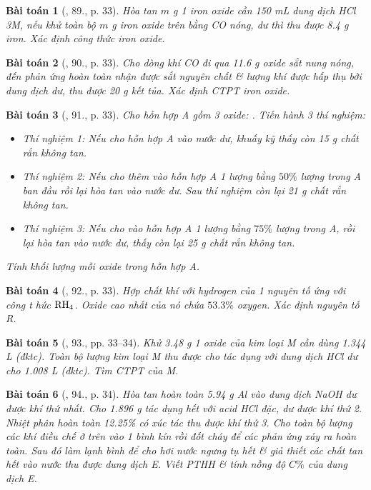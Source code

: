 \documentclass{article}
\newtheorem{baitoan}{Bài toán}
\begin{document}
\begin{baitoan}[\cite{An_400_BT_Hoa_Hoc_9}, 89., p. 33]
	Hòa tan $m$ {\rm g} 1 iron oxide cần {\rm150 mL} dung dịch {\rm HCl 3M}, nếu khử toàn bộ $m$ {\rm g} iron oxide trên bằng {\rm CO} nóng, dư thì thu được {\rm8.4 g} iron. Xác định công thức iron oxide.
\end{baitoan}

\begin{baitoan}[\cite{An_400_BT_Hoa_Hoc_9}, 90., p. 33]
	Cho dòng khí {\rm CO} đi qua {\rm11.6 g} oxide sắt nung nóng, đến phản ứng hoàn toàn nhận được sắt nguyên chất \& lượng khí được hấp thụ bởi dung dịch {\rm{}} dư, thu được {\rm20 g} kết tủa. Xác định {\rm CTPT} iron oxide.
\end{baitoan}

\begin{baitoan}[\cite{An_400_BT_Hoa_Hoc_9}, 91., p. 33]
	Cho hỗn hợp A gồm 3 oxide: {\rm{}}. Tiến hành 3 thí nghiệm:
	\begin{itemize}
		\item Thí nghiệm 1: Nếu cho hỗn hợp A vào nước dư, khuấy kỹ thấy còn {\rm15 g} chất rắn không tan.
		\item Thí nghiệm 2: Nếu cho thêm vào hỗn hợp A 1 lượng {\rm{}} bằng $50\%$ lượng {\rm{}} trong A ban đầu rồi lại hòa tan vào nước dư. Sau thí nghiệm còn lại {\rm21 g} chất rắn không tan.
		\item Thí nghiệm 3: Nếu cho vào hỗn hợp A 1 lượng {\rm{}} bằng $75\%$ lượng {\rm{}} trong A, rồi lại hòa tan vào nước dư, thấy còn lại {\rm25 g} chất rắn không tan.
	\end{itemize}
	Tính khối lượng mỗi oxide trong hỗn hợp A.
\end{baitoan}

\begin{baitoan}[\cite{An_400_BT_Hoa_Hoc_9}, 92., p. 33]
	Hợp chất khí với hydrogen của 1 nguyên tố ứng với công t hức $\rm RH_4$. Oxide cao nhất của nó chứa $53.3\%$ oxygen. Xác định nguyên tố R.
\end{baitoan}

\begin{baitoan}[\cite{An_400_BT_Hoa_Hoc_9}, 93., pp. 33--34]
	Khử {\rm3.48 g} 1 oxide của kim loại M cần dùng {\rm1.344 L } (đktc). Toàn bộ lượng kim loại M thu được cho tác dụng với dung dịch {\rm HCl} dư cho {\rm1.008 L } (đktc). Tìm {\rm CTPT} của M.
\end{baitoan}

\begin{baitoan}[\cite{An_400_BT_Hoa_Hoc_9}, 94., p. 34]
	Hòa tan hoàn  toàn {\rm5.94 g Al} vào dung dịch {\rm NaOH} dư được khí thứ nhất. Cho {\rm1.896 g } tác dụng hết với acid {\rm HCl} đặc, dư được khí thứ 2. Nhiệt phân hoàn toàn {\rm12.25\% } có xúc tác thu được khí thứ 3. Cho toàn bộ lượng các khí điều chế ở trên vào 1 bình kín rồi đốt cháy để các phản ứng xảy ra hoàn toàn. Sau đó làm lạnh bình để cho hơi nước ngưng tụ hết \& giả thiết các chất tan hết vào nước thu được dung dịch E. Viết {\rm PTHH} \& tính nồng độ $C\%$ của dung dịch E.
\end{baitoan}
\end{document}
